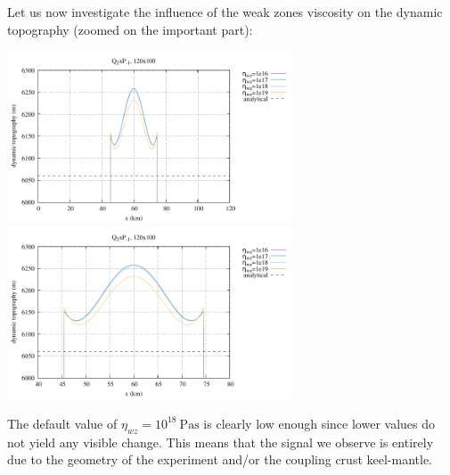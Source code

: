Let us now investigate the influence of the weak zones viscosity on the 
dynamic topography (zoomed on the important part):
\begin{center}
\includegraphics[width=8.5cm]{python_codes/fieldstone_160/results/dyn_topo3a.pdf}
\includegraphics[width=8.5cm]{python_codes/fieldstone_160/results/dyn_topo3b.pdf}
\end{center}
The default value of $\eta_{wz}=10^{18}~\si{\pascal\second}$ is clearly low enough since lower values do not 
yield any visible change. This means that the signal we observe is entirely due
to the geometry of the experiment and/or the coupling crust keel-mantle.

